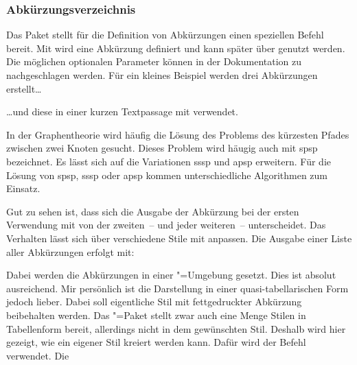 \documentclass[%
  english,ngerman,%
  geometry=no,DIV=12,automark,%
]{tudscrartcl}
\begin{document}
\subsubsection{Abkürzungsverzeichnis}
Das Paket  stellt für die Definition von Abkürzungen einen 
speziellen Befehl bereit. Mit\LParameter{}%
 wird eine Abkürzung definiert und 
kann später über  genutzt werden. Die möglichen optionalen 
Parameter können in der Dokumentation zu  nachgeschlagen 
werden. Für ein kleines Beispiel werden drei Abkürzungen erstellt\dots
%
\begin{Excerpt}
\end{Excerpt}
%
\dots und diese in einer kurzen Textpassage mit  
verwendet.
%
\begin{Excerpt}
In der Graphentheorie wird häufig die Lösung des Problems des kürzesten
Pfades zwischen zwei Knoten gesucht. Dieses Problem wird häugig auch
mit \gls{spsp} bezeichnet. Es lässt sich auf die Variationen \gls{sssp}
und \gls{apsp} erweitern. Für die Lösung von \gls{spsp}, \gls{sssp} oder 
\gls{apsp} kommen unterschiedliche Algorithmen zum Einsatz.
\end{Excerpt}
%
Gut zu sehen ist, dass sich die Ausgabe der Abkürzung bei der ersten Verwendung 
mit  von der zweiten~-- und jeder weiteren~-- unterscheidet. Das 
Verhalten lässt sich über verschiedene Stile mit  
anpassen. Die Ausgabe einer Liste aller Abkürzungen erfolgt mit:
%
\begin{Hint*}
\printacronyms
\end{Hint*}
\begin{quoting}[rightmargin=0pt]
\vspace*{-\baselineskip}
\glsdisablehyper
\printacronyms
\end{quoting}
%
Dabei werden die Abkürzungen in einer "=Umgebung 
gesetzt. Dies ist absolut ausreichend. Mir persönlich ist die Darstellung in 
einer quasi-tabellarischen Form jedoch lieber. Dabei soll eigentliche Stil mit 
fettgedruckter Abkürzung beibehalten werden. Das "=Paket 
stellt zwar auch eine Menge Stilen in Tabellenform bereit, allerdings nicht in 
dem gewünschten Stil. Deshalb wird hier gezeigt, wie ein eigener Stil kreiert 
werden kann. Dafür wird der Befehl  verwendet. Die 
\end{document}
